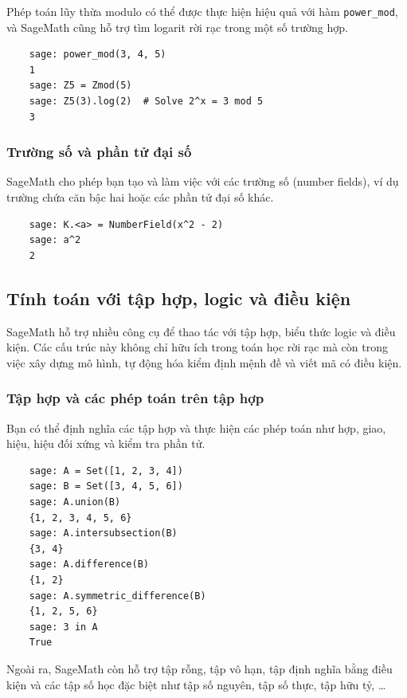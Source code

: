 Phép toán lũy thừa modulo có thể được thực hiện hiệu quả với hàm \texttt{power\_mod}, và SageMath cũng hỗ trợ tìm logarit rời rạc trong một số trường hợp.

\begin{lstlisting}
	sage: power_mod(3, 4, 5)
	1
	sage: Z5 = Zmod(5)
	sage: Z5(3).log(2)  # Solve 2^x = 3 mod 5
	3
\end{lstlisting}

\subsubsection{Trường số và phần tử đại số}

SageMath cho phép bạn tạo và làm việc với các trường số (number fields), ví dụ trường chứa căn bậc hai hoặc các phần tử đại số khác.

\begin{lstlisting}
	sage: K.<a> = NumberField(x^2 - 2)
	sage: a^2
	2
\end{lstlisting}


\subsection{Tính toán với tập hợp, logic và điều kiện}

SageMath hỗ trợ nhiều công cụ để thao tác với tập hợp, biểu thức logic và điều kiện. Các cấu trúc này không chỉ hữu ích trong toán học rời rạc mà còn trong việc xây dựng mô hình, tự động hóa kiểm định mệnh đề và viết mã có điều kiện.

\subsubsection{Tập hợp và các phép toán trên tập hợp}

Bạn có thể định nghĩa các tập hợp và thực hiện các phép toán như hợp, giao, hiệu, hiệu đối xứng và kiểm tra phần tử.

\begin{lstlisting}
	sage: A = Set([1, 2, 3, 4])
	sage: B = Set([3, 4, 5, 6])
	sage: A.union(B)
	{1, 2, 3, 4, 5, 6}
	sage: A.intersubsection(B)
	{3, 4}
	sage: A.difference(B)
	{1, 2}
	sage: A.symmetric_difference(B)
	{1, 2, 5, 6}
	sage: 3 in A
	True
\end{lstlisting}

Ngoài ra, SageMath còn hỗ trợ tập rỗng, tập vô hạn, tập định nghĩa bằng điều kiện và các tập số học đặc biệt như tập số nguyên, tập số thực, tập hữu tỷ, \dots


